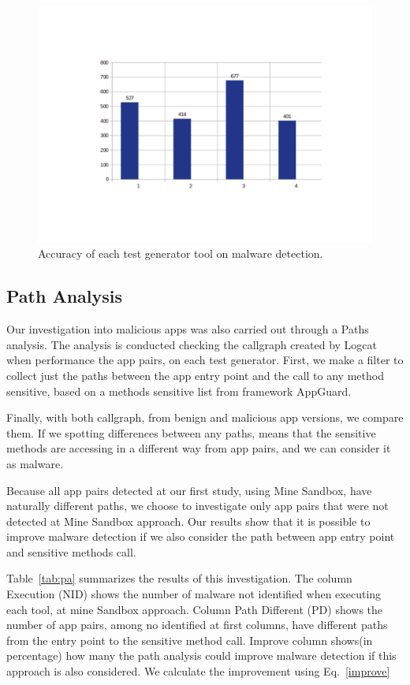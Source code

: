 \begin{figure}[ht]
\centering
\includegraphics[scale=0.3]{images/accuracy.pdf}
\caption{Accuracy of each test generator tool on malware detection.}
 \label{fig:accuracy}
\end{figure}

\subsection{Path Analysis}\label{sec:path}

Our investigation into malicious apps was also carried out through a Paths analysis. The analysis is conducted checking the callgraph created by Logcat when performance the app pairs, on each test generator. First, we make a filter to collect just the paths between the app entry point and the call to any method sensitive, based on a methods sensitive list from framework AppGuard.

Finally, with both callgraph, from benign and malicious app versions, we compare them. If we spotting differences between any paths, means that the sensitive methods are accessing in a different way from app pairs, and we can consider it as malware.

Because all app pairs detected at our first study, using Mine Sandbox, have naturally different paths, we choose to investigate only app pairs that were not detected at Mine Sandbox approach. Our results show that it is possible to improve malware detection if we also consider the path between app entry point and sensitive methods call.

Table~\ref{tab:pa} summarizes the results of this investigation. The column Execution (NID) shows the number of malware not identified when executing each tool, at mine Sandbox approach. Column  Path Different (PD) shows the number of app pairs, among no identified at first columns, have different paths from the entry point to the sensitive method call. Improve column shows(in percentage) how many the path analysis could improve malware detection if this approach is also considered. We calculate the improvement using Eq.~\eqref{improve}


